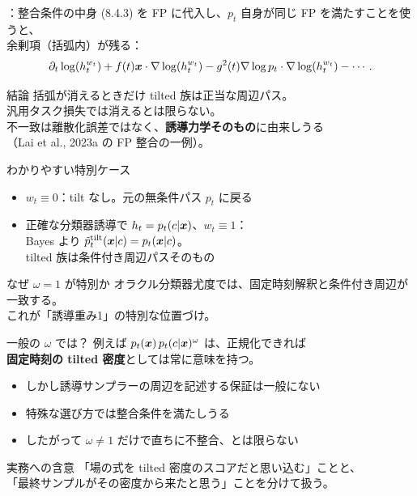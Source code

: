 \assuppl
\begin{frame}{\supplmark：整合条件の中身}
    (8.4.3) を FP に代入し、$p_t$ 自身が同じ FP を満たすことを使うと、\\
    余剰項（括弧内）が残る：
    \[
        \partial_t\log(h_t^{w_t})
        +f(t)\bm{x}\cdot\nabla\log(h_t^{w_t})
        -g^{2}(t)\nabla\log p_t\cdot\nabla\log(h_t^{w_t})
        -\cdots.
    \]
    \begin{block}{結論}
        括弧が消えるときだけ tilted 族は正当な周辺パス。\\
        汎用タスク損失では消えるとは限らない。\\
        不一致は離散化誤差ではなく、\textbf{誘導力学そのもの}に由来しうる\\
        （Lai et al., 2023a の FP 整合の一例）。
    \end{block}
\end{frame}
\asmain
\begin{frame}{わかりやすい特別ケース}
    \begin{itemize}
        \item $w_t\equiv 0$：tilt なし。元の無条件パス $p_t$ に戻る
        \item 正確な分類器誘導で $h_t=p_t(c|\bm{x})$、$w_t\equiv 1$：\\
        Bayes より $\tilde p_t^{\mathrm{tilt}}(\bm{x}|c)=p_t(\bm{x}|c)$。\\
        tilted 族は条件付き周辺パスそのもの
    \end{itemize}
    \begin{exampleblock}{なぜ $\omega=1$ が特別か}
        オラクル分類器尤度では、固定時刻解釈と条件付き周辺が一致する。\\
        これが「誘導重み1」の特別な位置づけ。
    \end{exampleblock}
\end{frame}
\asmain
\begin{frame}{一般の $\omega$ では？}
    例えば $p_t(\bm{x})\,p_t(c|\bm{x})^{\omega}$ は、正規化できれば\\
    \textbf{固定時刻の tilted 密度}としては常に意味を持つ。
    \begin{itemize}
        \item しかし誘導サンプラーの周辺を記述する保証は一般にない
        \item 特殊な選び方では整合条件を満たしうる
        \item したがって $\omega\neq 1$ だけで直ちに不整合、とは限らない
    \end{itemize}
    \begin{alertblock}{実務への含意}
        「場の式を tilted 密度のスコアだと思い込む」ことと、\\
        「最終サンプルがその密度から来たと思う」ことを分けて扱う。
    \end{alertblock}
\end{frame}
